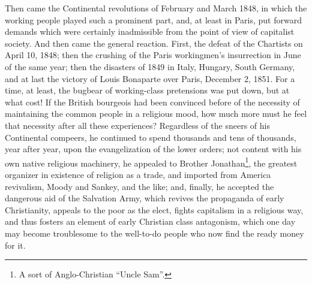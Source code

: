Then came the Continental revolutions of February and March 1848, in which the
working people played such a prominent part, and, at least in Paris, put
forward demands which were certainly inadmissible from the point of view of
capitalist society. And then came the general reaction. First, the defeat of the
Chartists on April 10, 1848; then the crushing of the Paris workingmen's
insurrection in June of the same year; then the disasters of 1849 in Italy,
Hungary, South Germany, and at last the victory of Louis Bonaparte over Paris,
December 2, 1851. For a time, at least, the bugbear of working-class pretensions
was put down, but at what cost! If the British bourgeois had been convinced
before of the necessity of maintaining the common people in a religious mood,
how much more must he feel that necessity after all these experiences?
Regardless of the sneers of his Continental compeers, he continued to spend
thousands and tens of thousands, year after year, upon the evangelization of the
lower orders; not content with his own native religious machinery, he appealed
to Brother Jonathan\footnote{A sort of Anglo-Christian ``Uncle Sam''.}, the
greatest organizer in existence of religion as a trade, and imported from
America revivalism, Moody and Sankey, and the like; and, finally, he accepted
the dangerous aid of the Salvation Army, which revives the propaganda of early
Christianity, appeals to the poor as the elect, fights capitalism in a religious
way, and thus fosters an element of early Christian class antagonism, which one
day may become troublesome to the well-to-do people who now find the ready money
for it.

